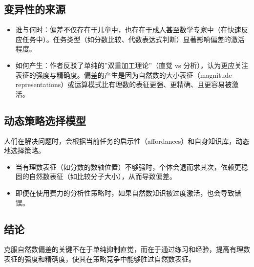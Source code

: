 \subsection{变异性的来源}

\begin{itemize}
    \item 谁与何时：偏差不仅存在于儿童中，也存在于成人甚至数学专家中（在快速反应任务中）。任务类型（如分数比较、代数表达式判断）显著影响偏差的激活程度。
    \item 如何产生：作者反驳了单纯的”双重加工理论”（直觉 vs 分析），认为更应关注表征的强度与精确度。偏差的产生是因为自然数的大小表征（magnitude representations）或运算模式比有理数的表征更强、更精确、且更容易被激活。
\end{itemize}

\subsection{动态策略选择模型}

人们在解决问题时，会根据当前任务的启示性（affordances）和自身知识库，动态地选择策略。
\begin{itemize}
    \item 当有理数表征（如分数的数轴位置）不够强时，个体会退而求其次，依赖更稳固的自然数表征（如比较分子大小），从而导致偏差。
    \item 即便在使用费力的分析性策略时，如果自然数知识被过度激活，也会导致错误。
\end{itemize}

\subsection{结论}

克服自然数偏差的关键不在于单纯抑制直觉，而在于通过练习和经验，提高有理数表征的强度和精确度，使其在策略竞争中能够胜过自然数表征。
